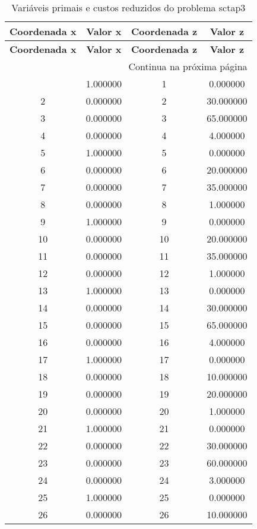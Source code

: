 \documentclass[12pt]{article}
\begin{document}
\begin{longtable}{@{}cccc@{}}
\caption{Variáveis primais e custos reduzidos do problema sctap3} \\
\toprule
\textbf{Coordenada x} & \textbf{Valor x} & \textbf{Coordenada z} & \textbf{Valor z} \\
\midrule
\endfirsthead

\toprule
\textbf{Coordenada x} & \textbf{Valor x} & \textbf{Coordenada z} & \textbf{Valor z} \\
\midrule
\endhead

\midrule \multicolumn{4}{r}{{Continua na próxima página}} \\ \midrule
\endfoot

\bottomrule
\endlastfoot
1 & 1.000000 & 1 & 0.000000 \\
2 & 0.000000 & 2 & 30.000000 \\
3 & 0.000000 & 3 & 65.000000 \\
4 & 0.000000 & 4 & 4.000000 \\
5 & 1.000000 & 5 & 0.000000 \\
6 & 0.000000 & 6 & 20.000000 \\
7 & 0.000000 & 7 & 35.000000 \\
8 & 0.000000 & 8 & 1.000000 \\
9 & 1.000000 & 9 & 0.000000 \\
10 & 0.000000 & 10 & 20.000000 \\
11 & 0.000000 & 11 & 35.000000 \\
12 & 0.000000 & 12 & 1.000000 \\
13 & 1.000000 & 13 & 0.000000 \\
14 & 0.000000 & 14 & 30.000000 \\
15 & 0.000000 & 15 & 65.000000 \\
16 & 0.000000 & 16 & 4.000000 \\
17 & 1.000000 & 17 & 0.000000 \\
18 & 0.000000 & 18 & 10.000000 \\
19 & 0.000000 & 19 & 20.000000 \\
20 & 0.000000 & 20 & 1.000000 \\
21 & 1.000000 & 21 & 0.000000 \\
22 & 0.000000 & 22 & 30.000000 \\
23 & 0.000000 & 23 & 60.000000 \\
24 & 0.000000 & 24 & 3.000000 \\
25 & 1.000000 & 25 & 0.000000 \\
26 & 0.000000 & 26 & 10.000000 \\

\end{longtable}
\end{document}
